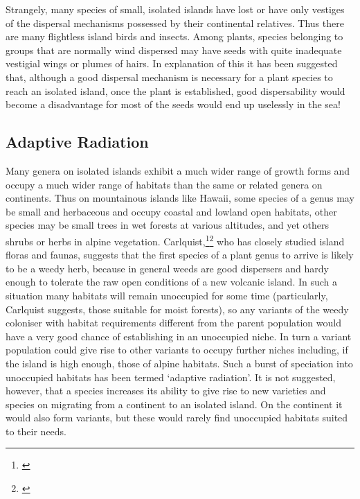 Strangely, many species of small, isolated islands have lost or have only vestiges of the dispersal mechanisms possessed by their continental relatives.
Thus there are many flightless island birds and insects.
Among plants, species belonging to groups that are normally wind dispersed may have seeds with quite inadequate vestigial wings or plumes of hairs.
In explanation of this it has been suggested that, although a good dispersal mechanism is necessary for a plant species to reach an isolated island, once the plant is established, good dispersability would become a disadvantage for most of the seeds would end up uselessly in the sea!

\subsection{Adaptive Radiation}

Many genera on isolated islands exhibit a much wider range of growth forms and occupy a much wider range of habitats than the same or related genera on continents.
Thus on mountainous islands like Hawai{\okina}i, some species of a genus may be small and herbaceous and occupy coastal and lowland open habitats, other species may be small trees in wet forests at various altitudes, and yet others shrubs or herbs in alpine vegetation.
Carlquist,\footnote{\cite{carlquist1970hawaii}}\footnote{\cite{carlquist1965island}} who has closely studied island floras and faunas, suggests that the first species of a plant genus to arrive is likely to be a weedy herb, because in general weeds are good dispersers and hardy enough to tolerate the raw open conditions of a new volcanic island.
In such a situation many habitats will remain unoccupied for some time (particularly, Carlquist suggests, those suitable for moist forests), so any variants of the weedy coloniser with habitat requirements different from the parent population would have a very good chance of establishing in an unoccupied niche.
In turn a variant population could give rise to other variants to occupy further niches including, if the island is high enough, those of alpine habitats.
Such a burst of speciation into unoccupied habitats has been termed `adaptive radiation'.
It is not suggested, however, that a species increases its ability to give rise to new varieties and species on migrating from a continent to an isolated island.
On the continent it would also form variants, but these would rarely find unoccupied habitats suited to their needs.

